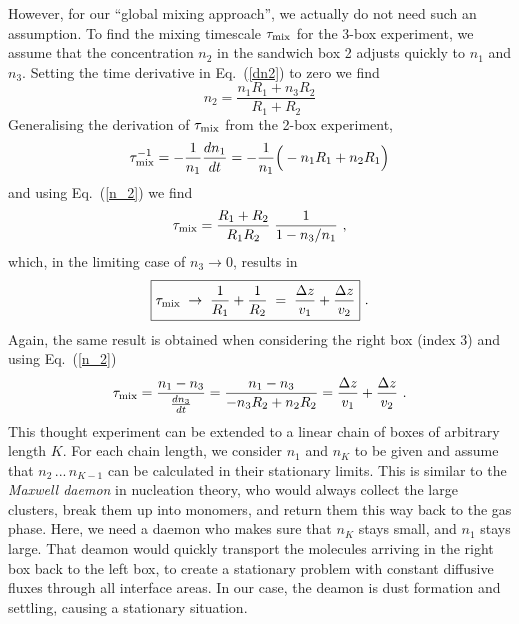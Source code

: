 \documentclass[11pt]{article}
\begin{document}
However, for our ``global mixing approach'', we actually do not need
such an assumption. To find the mixing timescale $\tau_{\rm mix}$ for the
3-box experiment, we assume that the concentration $n_2$ in the
sandwich box 2 adjusts quickly to $n_1$ and $n_3$. Setting the time
derivative in Eq.~(\ref{dn2}) to zero we find
\begin{equation}
  n_2 = \frac{n_1 R_1 + n_3 R_2}{R_1+R_2} 
  \label{n_2}
\end{equation}
Generalising the derivation of $\tau_{\rm mix}$ from the 2-box
experiment, 
\begin{equation}
  \tau_{\rm mix}^{-1} = -\frac{1}{n_1}\frac{dn_1}{dt} 
                    = -\frac{1}{n_1}\Big(-n_1 R_1 + n_2 R_1\Big)
\end{equation}
and using Eq.~(\ref{n_2}) we find
\begin{equation}
  \tau_{\rm mix} = \frac{R_1 + R_2}{R_1 R_2}
                  \;\frac{1}{1-n_3/n_1}  \ ,
\end{equation}
which, in the limiting case of $n_3\to 0$, results in
\begin{equation}
  \boxed{\tau_{\rm mix} \;\to\; \frac{1}{R_1} + \frac{1}{R_2}
  \;=\; \frac{\Delta z}{v_1} + \frac{\Delta z}{v_2}} \ .
  \label{tmix2}
\end{equation}
Again, the same result is obtained when considering the right box
(index 3) and using Eq.~(\ref{n_2})
\begin{equation}
  {\tau_{\rm mix}} = \frac{n_1-n_3}{\frac{dn_3}{dt}}
                  = \frac{n_1-n_3}{-n_3 R_2 + n_2 R_2}
                  = \frac{\Delta z}{v_1} + \frac{\Delta z}{v_2} \ .
\end{equation}
This thought experiment can be extended to a linear chain of boxes of 
arbitrary length $K$. For each chain length, we consider $n_1$ and
$n_K$ to be given and assume that $n_2\,...\,n_{K-1}$ can be calculated in their
stationary limits. This is similar to the {\it Maxwell daemon} in
nucleation theory, who would always collect the large clusters, break
them up into monomers, and return them this way back to the gas phase.
Here, we need a daemon who makes
sure that $n_K$ stays small, and $n_1$ stays large. That deamon would
quickly transport the molecules arriving in the right box back to the
left box, to create a stationary problem with constant diffusive fluxes
through all interface areas. In our case, the deamon is dust
  formation and settling, causing a stationary situation.
\end{document}
